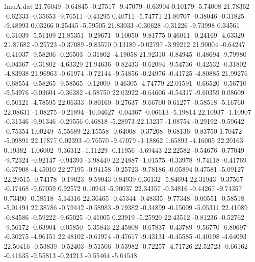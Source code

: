 \begin{filecontents}{ImuA.dat}
  21.76049   -0.64845   -0.27517   -9.47079   -0.63904    0.10179   -5.74008
  21.78362   -0.62333   -0.35653   -9.76511   -0.43295    0.40711   -5.74771
  21.80707   -0.38046   -0.31825   -9.48993    0.03266    0.25445   -5.59505
  21.83033   -0.30628   -0.31226   -9.73998    0.34561   -0.31039   -5.51109
  21.85351   -0.29671   -0.10050   -9.81775    0.46011   -0.24169   -4.63329
  21.87682   -0.25723   -0.37089   -9.83570    0.13189   -0.02797   -3.99212
  21.90004   -0.64247   -0.41037   -9.58206   -0.26503   -0.31802   -4.19058
  21.92310   -0.84945   -0.48694   -9.79980   -0.04367   -0.31802   -4.63329
  21.94636   -0.82433   -0.62094   -9.54736   -0.42532   -0.31802   -4.83938
  21.96963   -0.61974   -0.72144   -9.54856   -0.24976   -0.41725   -4.80885
  21.99276   -0.68554   -0.58265   -9.58565   -0.12000   -0.46305   -4.74779
  22.01591   -0.66520   -0.56710   -9.54976   -0.03604   -0.36382   -4.58750
  22.03922   -0.64606   -0.54317   -9.60359    0.08609   -0.50121   -4.78595
  22.06333   -0.80160   -0.27637   -9.66700    0.61277   -0.58518   -5.16760
  22.08631   -1.08275   -0.21894  -10.04627   -0.04367   -0.06613   -5.19814
  22.10937   -1.10907   -0.31346   -9.91346   -0.29556    0.46818   -5.28973
  22.13237   -1.08754   -0.29192   -9.59642   -0.75354    1.00249   -5.55689
  22.15558   -0.64008   -0.37208   -9.68136   -0.83750    1.70472   -5.09891
  22.17877    0.02393   -0.76570   -9.47079   -1.18862    1.65893   -4.16005
  22.20163    0.19382   -1.06002   -9.36312   -1.11229   -0.11956   -3.69443
  22.22582   -0.54676   -0.77049   -9.72324   -0.92147   -0.94393   -3.98449
  22.24887   -1.01575   -0.33978   -9.74118   -0.41769   -0.37908   -4.45010
  22.27195   -0.94158   -0.25723   -9.78186   -0.05894    0.47581   -5.09127
  22.29515   -0.74178   -0.19023   -9.59043    0.84939    0.36132   -5.84694
  22.31943   -0.37567   -0.17468   -9.67059    0.92572    0.10943   -5.90037
  22.34157   -0.34816   -0.44267   -9.74357    0.73490   -0.58518   -5.34316
  22.36465   -0.45344   -0.48335   -9.77348   -0.00551   -0.58518   -5.01494
  22.38786   -0.79442   -0.58983   -9.79382   -0.34899   -0.15009   -5.05311
  22.41089   -0.84586   -0.59222   -9.65025   -0.41005    0.23919   -5.25920
  22.43512   -0.81236   -0.52762   -9.56172   -0.63904   -0.05850   -5.35843
  22.45808   -0.67837   -0.43789   -9.56770   -0.80697   -0.30275   -4.96151
  22.48102   -0.61974   -0.47617   -9.43131   -0.45585   -0.40198   -4.64093
  22.50416   -0.53839   -0.52403   -9.51506   -0.53982   -0.72257   -4.71726
  22.52723   -0.66162   -0.41635   -9.55813   -0.24213   -0.55464   -5.04548

\end{filecontents}
